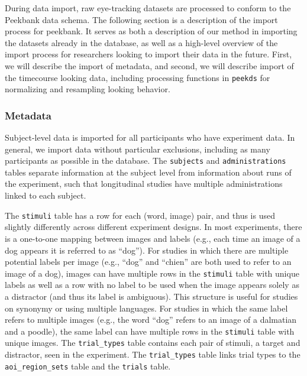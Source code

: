 \documentclass[
  english,
  man,floatsintext]{apa6}
\begin{document}
During data import, raw eye-tracking datasets are processed to conform to the Peekbank data schema.
The following section is a description of the import process for peekbank.
It serves as both a description of our method in importing the datasets already in the database, as well as a high-level overview of the import process for researchers looking to import their data in the future.
First, we will describe the import of metadata, and second, we will describe import of the timecourse looking data, including processing functions in \texttt{peekds} for normalizing and resampling looking behavior.

\hypertarget{metadata-1}{%
\subsubsection{Metadata}\label{metadata-1}}

Subject-level data is imported for all participants who have experiment data.
In general, we import data without particular exclusions, including as many participants as possible in the database.
The \texttt{subjects} and \texttt{administrations} tables separate information at the subject level from information about runs of the experiment, such that longitudinal studies have multiple administrations linked to each subject.

The \texttt{stimuli} table has a row for each (word, image) pair, and thus is used slightly differently across different experiment designs.
In most experiments, there is a one-to-one mapping between images and labels (e.g., each time an image of a dog appears it is referred to as \enquote{dog}).
For studies in which there are multiple potential labels per image (e.g., \enquote{dog} and \enquote{chien} are both used to refer to an image of a dog), images can have multiple rows in the \texttt{stimuli} table with unique labels as well as a row with no label to be used when the image appears solely as a distractor (and thus its label is ambiguous).
This structure is useful for studies on synonymy or using multiple languages.
For studies in which the same label refers to multiple images (e.g., the word \enquote{dog} refers to an image of a dalmatian and a poodle), the same label can have multiple rows in the \texttt{stimuli} table with unique images.
The \texttt{trial\_types} table contains each pair of stimuli, a target and distractor, seen in the experiment.
The \texttt{trial\_types} table links trial types to the \texttt{aoi\_region\_sets} table and the \texttt{trials} table.
\end{document}
